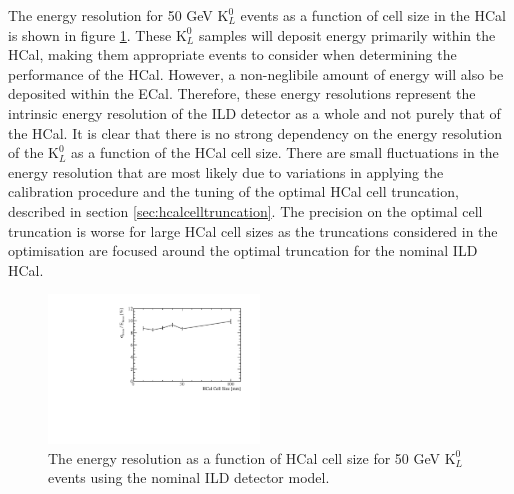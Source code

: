 The energy resolution for 50 GeV $\text{K}^{0}_{L}$ events as a function of cell size in the HCal is shown in figure \ref{fig:hcalcellser}.  These $\text{K}^{0}_{L}$ samples will deposit energy primarily within the HCal, making them appropriate events to consider when determining the performance of the HCal.  However, a non-neglibile amount of energy will also be deposited within the ECal.  Therefore, these energy resolutions represent the intrinsic energy resolution of the ILD detector as a whole and not purely that of the HCal.  It is clear that there is no strong dependency on the energy resolution of the $\text{K}^{0}_{L}$ as a function of the HCal cell size.  There are small fluctuations in the energy resolution that are most likely due to variations in applying the calibration procedure and the tuning of the optimal HCal cell truncation, described in section \ref{sec:hcalcelltruncation}.  The precision on the optimal cell truncation is worse for large HCal cell sizes as the truncations considered in the optimisation are focused around the optimal truncation for the nominal ILD HCal.  

\begin{figure}[h!]
\centering
\includegraphics[width=0.5\textwidth]{OptimisationStudies/Plots/EnergyResolution/ER_vs_HCalCellSize_50GeVKaon0L.pdf}
\caption[The energy resolution as a function of HCal cell size for 50 GeV $\text{K}^{0}_{L}$ events using the nominal ILD detector model.]{The energy resolution as a function of HCal cell size for 50 GeV $\text{K}^{0}_{L}$ events using the nominal ILD detector model.}
\label{fig:hcalcellser}
\end{figure}

